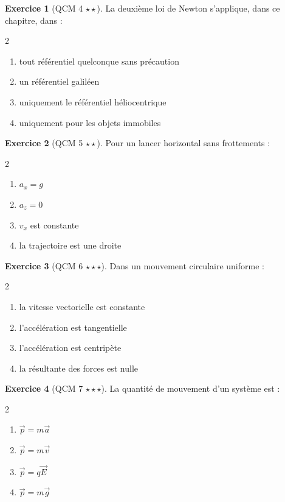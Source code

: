 \documentclass[11pt,a4paper]{article}
\theoremstyle{definition}
\newtheorem{exercice}{Exercice}[section]
\newcommand{\etoiles}[1]{\hfill{\small\textbf{#1}}}
\begin{document}
\begin{exercice}[QCM 4 \etoiles{$\star\star$}]
La deuxième loi de Newton s’applique, dans ce chapitre, dans :
\begin{multicols}{2}
\begin{enumerate}[label=\Alph*.]
    \item tout référentiel quelconque sans précaution
    \item un référentiel galiléen
    \item uniquement le référentiel héliocentrique
    \item uniquement pour les objets immobiles
\end{enumerate}
\end{multicols}
\end{exercice}

\begin{exercice}[QCM 5 \etoiles{$\star\star$}]
Pour un lancer horizontal sans frottements :
\begin{multicols}{2}
\begin{enumerate}[label=\Alph*.]
    \item $a_x=g$
    \item $a_z=0$
    \item $v_x$ est constante
    \item la trajectoire est une droite
\end{enumerate}
\end{multicols}
\end{exercice}

\begin{exercice}[QCM 6 \etoiles{$\star\star\star$}]
Dans un mouvement circulaire uniforme :
\begin{multicols}{2}
\begin{enumerate}[label=\Alph*.]
    \item la vitesse vectorielle est constante
    \item l’accélération est tangentielle
    \item l’accélération est centripète
    \item la résultante des forces est nulle
\end{enumerate}
\end{multicols}
\end{exercice}

\begin{exercice}[QCM 7 \etoiles{$\star\star\star$}]
La quantité de mouvement d’un système est :
\begin{multicols}{2}
\begin{enumerate}[label=\Alph*.]
    \item $\vec{p}=m\vec{a}$
    \item $\vec{p}=m\vec{v}$
    \item $\vec{p}=q\vec{E}$
    \item $\vec{p}=m\vec{g}$
\end{enumerate}
\end{multicols}
\end{exercice}
\end{document}
